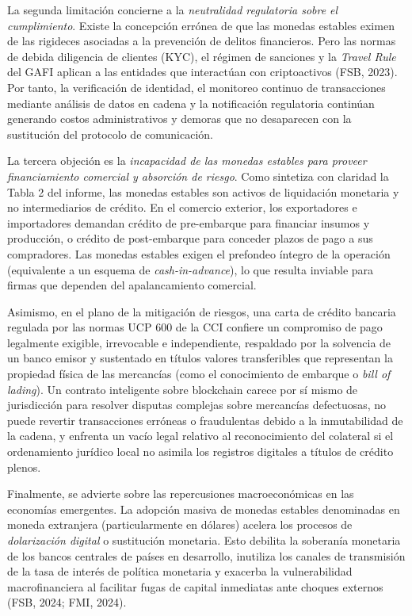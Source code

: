 \documentclass[spanish,11pt]{article}
\begin{document}
La segunda limitación concierne a la \emph{neutralidad regulatoria sobre el cumplimiento}. Existe la concepción errónea de que las 
monedas estables eximen de las rigideces asociadas a la prevención de delitos financieros. Pero las normas de debida diligencia de clientes (KYC), 
el régimen de sanciones y la \emph{Travel Rule} del GAFI aplican a las entidades que interactúan con criptoactivos (FSB, 2023). Por tanto, la verificación de identidad, 
el monitoreo continuo de transacciones mediante análisis de datos en cadena y la notificación regulatoria continúan generando costos administrativos 
y demoras que no desaparecen con la sustitución del protocolo de comunicación.

La tercera objeción es la \emph{incapacidad de las monedas estables para proveer financiamiento comercial y absorción de riesgo}. Como 
sintetiza con claridad la Tabla 2 del informe, las monedas estables son activos de liquidación monetaria y no intermediarios de crédito. 
En el comercio exterior, los exportadores e importadores demandan crédito de pre-embarque para financiar insumos y producción, o crédito de 
post-embarque para conceder plazos de pago a sus compradores. Las monedas estables exigen el prefondeo íntegro de la operación 
(equivalente a un esquema de \emph{cash-in-advance}), lo que resulta inviable para firmas que dependen del apalancamiento comercial.

Asimismo, en el plano de la mitigación de riesgos, una carta de crédito bancaria regulada por las normas UCP 600 de la CCI confiere
un compromiso de pago legalmente exigible, irrevocable e independiente, respaldado por la solvencia de un banco emisor y sustentado en 
títulos valores transferibles que representan la propiedad física de las mercancías (como el conocimiento de embarque o \emph{bill of lading}). 
Un contrato inteligente sobre blockchain carece por sí mismo de jurisdicción para resolver disputas complejas sobre mercancías defectuosas, 
no puede revertir transacciones erróneas o fraudulentas debido a la inmutabilidad de la cadena, y enfrenta un vacío legal relativo 
al reconocimiento del colateral si el ordenamiento jurídico local no asimila los registros digitales a títulos de crédito plenos.

Finalmente, se advierte sobre las repercusiones macroeconómicas en las economías emergentes. La adopción masiva de monedas estables 
denominadas en moneda extranjera (particularmente en dólares) acelera los procesos de \emph{dolarización digital} o sustitución monetaria. Esto 
debilita la soberanía monetaria de los bancos centrales de países en desarrollo, inutiliza los canales de transmisión de la tasa de interés de 
política monetaria y exacerba la vulnerabilidad macrofinanciera al facilitar fugas de capital inmediatas ante choques externos (FSB, 2024; FMI, 2024).
\end{document}
